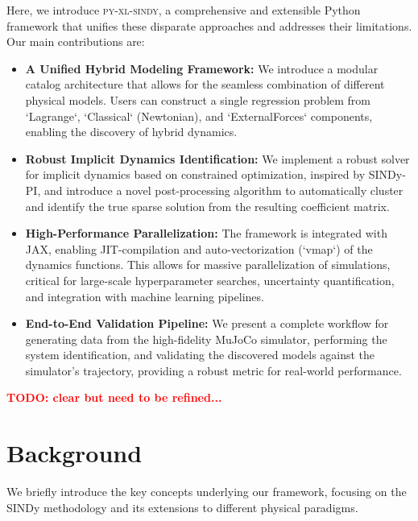 \documentclass[12pt]{article}
\newcommand{\frameworkname}{\textsc{py-xl-sindy}}
\newcommand{\TODO}[1]{\textbf{\textcolor{red}{\Large TODO: \normalsize #1}}}
\begin{document}
Here, we introduce \frameworkname, a comprehensive and extensible Python framework that unifies these disparate approaches and addresses their limitations. Our main contributions are:
\begin{itemize}
    \item \textbf{A Unified Hybrid Modeling Framework:} We introduce a modular catalog architecture that allows for the seamless combination of different physical models. Users can construct a single regression problem from `Lagrange`, `Classical` (Newtonian), and `ExternalForces` components, enabling the discovery of hybrid dynamics.
    \item \textbf{Robust Implicit Dynamics Identification:} We implement a robust solver for implicit dynamics based on constrained optimization, inspired by SINDy-PI, and introduce a novel post-processing algorithm to automatically cluster and identify the true sparse solution from the resulting coefficient matrix.
    \item \textbf{High-Performance Parallelization:} The framework is integrated with JAX, enabling JIT-compilation and auto-vectorization (`vmap`) of the dynamics functions. This allows for massive parallelization of simulations, critical for large-scale hyperparameter searches, uncertainty quantification, and integration with machine learning pipelines.
    \item \textbf{End-to-End Validation Pipeline:} We present a complete workflow for generating data from the high-fidelity MuJoCo simulator, performing the system identification, and validating the discovered models against the simulator's trajectory, providing a robust metric for real-world performance.
\end{itemize}

\TODO{clear but need to be refined... }

\section*{Background}

We briefly introduce the key concepts underlying our framework, focusing on the SINDy methodology and its extensions to different physical paradigms.
\end{document}
